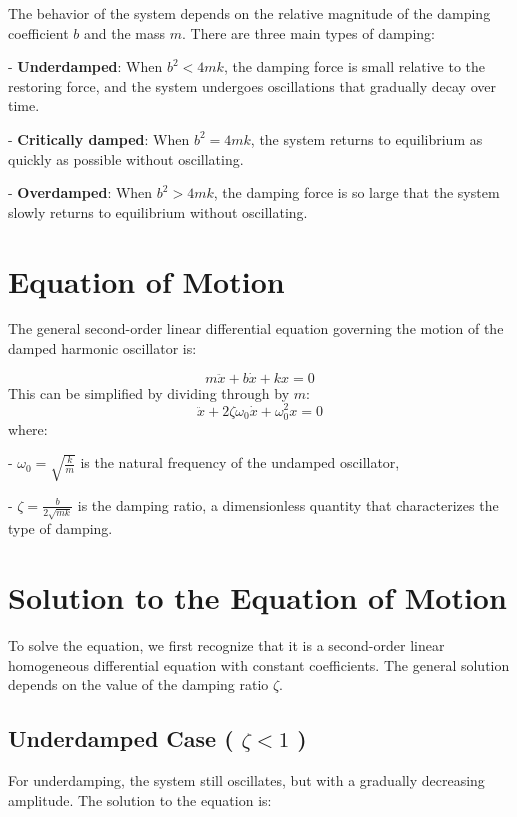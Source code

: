 \documentclass{article}
\begin{document}
The behavior of the system depends on the relative magnitude of the damping coefficient \( b \) and the mass \( m \). There are three main types of damping:

- \textbf{Underdamped}: When \( b^2 < 4mk \), the damping force is small relative to the restoring force, and the system undergoes oscillations that gradually decay over time.\newline

- \textbf{Critically damped}: When \( b^2 = 4mk \), the system returns to equilibrium as quickly as possible without oscillating.\newline

- \textbf{Overdamped}: When \( b^2 > 4mk \), the damping force is so large that the system slowly returns to equilibrium without oscillating.\newline

\section{Equation of Motion} 

The general second-order linear differential equation governing the motion of the damped harmonic oscillator is:

\[
m \ddot{x} + b \dot{x} + kx = 0
\]
This can be simplified by dividing through by \( m \):
\[
\ddot{x} + 2\zeta \omega_0 \dot{x} + \omega_0^2 x = 0
\]
where:

- \( \omega_0 = \sqrt{\frac{k}{m}} \) is the natural frequency of the undamped oscillator,

- \( \zeta = \frac{b}{2\sqrt{mk}} \) is the damping ratio, a dimensionless quantity that characterizes the type of damping.

\section{Solution to the Equation of Motion}

To solve the equation, we first recognize that it is a second-order linear homogeneous differential equation with constant coefficients. The general solution depends on the value of the damping ratio \( \zeta \).


\subsection{Underdamped Case ( \( \zeta < 1 \) )}

For underdamping, the system still oscillates, but with a gradually decreasing amplitude. The solution to the equation is:
\end{document}
